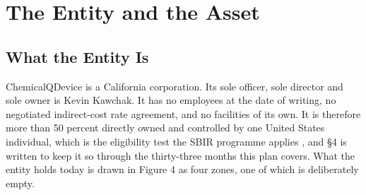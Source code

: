 \section{The Entity and the Asset}

\subsection{What the Entity Is}

ChemicalQDevice is a California corporation. Its sole officer, sole director and
sole owner is Kevin Kawchak. It has no employees at the date of writing, no
negotiated indirect-cost rate agreement, and no facilities of its own. It is
therefore more than 50 percent directly owned and controlled by one United
States individual, which is the eligibility test the SBIR programme applies
\cite{ecfr2026sbirownership}, and \S4 is written to keep it so through the
thirty-three months this plan covers. What the entity holds today is drawn in
Figure 4 as four zones, one of which is deliberately empty.

